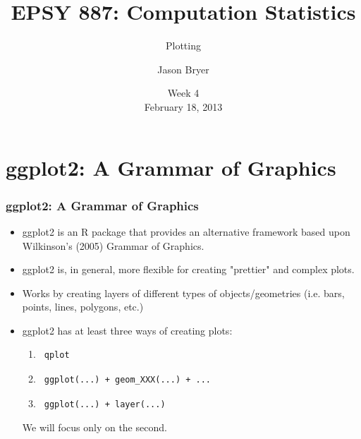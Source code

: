 \documentclass[10pt,slidestop,mathserif,c]{beamer}
\title{EPSY 887: Computation Statistics}
\subtitle{Plotting}
\author[Jason Bryer]{Jason Bryer}
\institute[Jason.Bryer.org]{\url{http://github.com/jbryer/CompStats}\\\href{mailto:jason@bryer.org}{jason@bryer.org}}
\date[Feb 18, 2013]{Week 4\\February 18, 2013}
\begin{document}


\frame{\titlepage}


\section{ggplot2: A Grammar of Graphics}

\begin{frame}
	\frametitle{ggplot2: A Grammar of Graphics}
	\begin{itemize}
		\item ggplot2 is an R package that provides an alternative framework based upon Wilkinson's (2005) Grammar of Graphics.
		\item ggplot2 is, in general, more flexible for creating "prettier" and complex plots.
		\item Works by creating layers of different types of objects/geometries (i.e. bars, points, lines, polygons, etc.)
		\item ggplot2 has at least three ways of creating plots:
			\begin{enumerate}
				\item \begin{verbatim} qplot \end{verbatim} 
				\item \begin{verbatim} ggplot(...) + geom_XXX(...) + ... \end{verbatim}
				\item \begin{verbatim} ggplot(...) + layer(...) \end{verbatim}
			\end{enumerate}
		We will focus only on the second.
	\end{itemize}
\end{frame}
\end{document}
